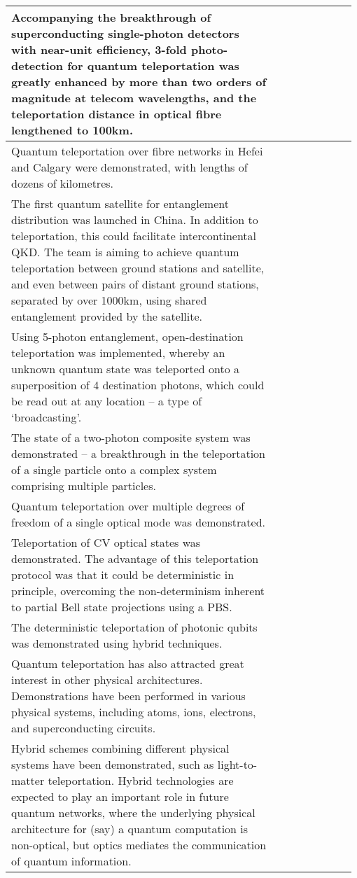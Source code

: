 \begin{table*}[!htbp]
\begin{tabular}{|p{0.755\linewidth}|p{0.22\linewidth}|}
	\hline
	Accompanying the breakthrough of superconducting single-photon detectors with near-unit efficiency, 3-fold photo-detection for quantum teleportation was greatly enhanced by more than two orders of magnitude at telecom wavelengths, and the teleportation distance in optical fibre lengthened to 100km. & \cite{bib:Optica_2_832} \\
	\hline
	Quantum teleportation over fibre networks in Hefei and Calgary were demonstrated, with lengths of dozens of kilometres. & \cite{bib:sun2016quantum, bib:Nat_Phot_10_676} \\
	\hline
	The first quantum satellite for entanglement distribution was launched in China. In addition to teleportation, this could facilitate intercontinental QKD. The team is aiming to achieve quantum teleportation between ground stations and satellite, and even between pairs of distant ground stations, separated by over 1000km, using shared entanglement provided by the satellite. & \cite{bib:Nat_535_478} \\
	\hline
	Using 5-photon entanglement, open-destination teleportation was implemented, whereby an unknown quantum state was teleported onto a superposition of 4 destination photons, which could be read out at any location -- a type of `broadcasting'. & \cite{bib:zhao2004experimental} \\
	\hline
	The state of a two-photon composite system was demonstrated -- a breakthrough in the teleportation of a single particle onto a complex system comprising multiple particles. & \cite{bib:Nat_Phys_2_678} \\
	\hline
	Quantum teleportation over multiple degrees of freedom of a single optical mode was demonstrated. & \cite{bib:Nat_518_516} \\
	\hline
	Teleportation of CV optical states was demonstrated. The advantage of this teleportation protocol was that it could be deterministic in principle,  overcoming the non-determinism inherent to partial Bell state projections using a PBS. & \cite{bib:Science_282_706} \\
	\hline
	The deterministic teleportation of photonic qubits was demonstrated using hybrid techniques. & \cite{bib:Nat_500_315} \\
	\hline
	Quantum teleportation has also attracted great interest in other physical architectures. Demonstrations have been performed in various physical systems, including atoms, ions, electrons, and superconducting circuits. & \cite{bib:Nat_Phys_9_400, bib:Nat_429_734, bib:Nat_429_737, bib:Science_345_532, bib:Nat_500_319} \\
	\hline
Hybrid schemes combining different physical systems have been demonstrated, such as light-to-matter teleportation. Hybrid technologies are expected to play an important role in future quantum networks, where the underlying physical architecture for (say) a quantum computation is non-optical, but optics mediates the communication of quantum information. & \cite{bib:Nat_443_557, bib:Nat_Comm_4_2744} \\
	\hline
\end{tabular}
\end{table*}

